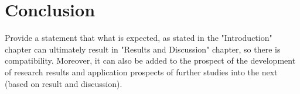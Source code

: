 \section{Conclusion}
Provide a statement that what is expected, as stated in the "Introduction" chapter can ultimately result in "Results and Discussion" chapter, so there is compatibility. Moreover, it can also be added to the prospect of the development of research results and application prospects of further studies into the next (based on result and discussion).
